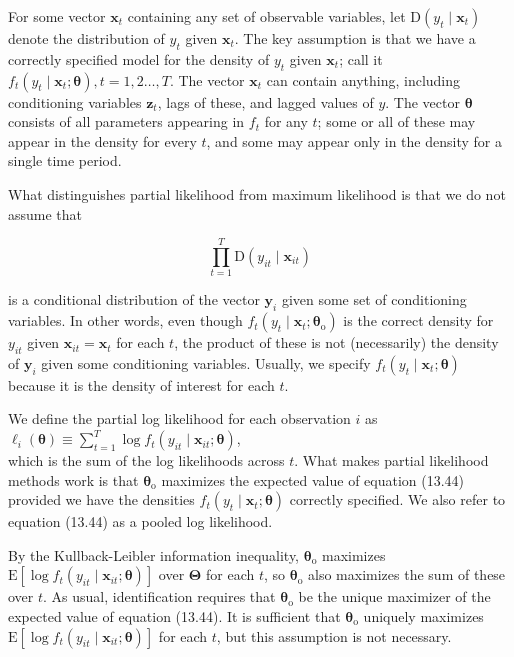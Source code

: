 \documentclass[10pt]{article}
\begin{document}
For some vector $\mathbf{x}_{t}$ containing any set of observable variables, let $\mathrm{D}\left(y_{t} \mid \mathbf{x}_{t}\right)$ denote the distribution of $y_{t}$ given $\mathbf{x}_{t}$. The key assumption is that we have a correctly specified model for the density of $y_{t}$ given $\mathbf{x}_{t}$; call it $f_{t}\left(y_{t} \mid \mathbf{x}_{t} ; \boldsymbol{\theta}\right), t=1,2 \ldots, T$. The vector $\mathbf{x}_{t}$ can contain anything, including conditioning variables $\mathbf{z}_{t}$, lags of these, and lagged values of $y$. The vector $\boldsymbol{\theta}$ consists of all parameters appearing in $f_{t}$ for any $t$; some or all of these may appear in the density for every $t$, and some may appear only in the density for a single time period.

What distinguishes partial likelihood from maximum likelihood is that we do not assume that


\begin{equation*}
\prod_{t=1}^{T} \mathrm{D}\left(y_{i t} \mid \mathbf{x}_{i t}\right) \tag{13.43}
\end{equation*}


is a conditional distribution of the vector $\mathbf{y}_{i}$ given some set of conditioning variables. In other words, even though $f_{t}\left(y_{t} \mid \mathbf{x}_{t} ; \boldsymbol{\theta}_{\mathrm{o}}\right)$ is the correct density for $y_{i t}$ given $\mathbf{x}_{i t}=\mathbf{x}_{t}$ for each $t$, the product of these is not (necessarily) the density of $\mathbf{y}_{i}$ given some conditioning variables. Usually, we specify $f_{t}\left(y_{t} \mid \mathbf{x}_{t} ; \boldsymbol{\theta}\right)$ because it is the density of interest for each $t$.

We define the partial log likelihood for each observation $i$ as\\
$\ell_{i}(\boldsymbol{\theta}) \equiv \sum_{t=1}^{T} \log f_{t}\left(y_{i t} \mid \mathbf{x}_{i t} ; \boldsymbol{\theta}\right)$,\\
which is the sum of the log likelihoods across $t$. What makes partial likelihood methods work is that $\boldsymbol{\theta}_{\mathrm{o}}$ maximizes the expected value of equation (13.44) provided we have the densities $f_{t}\left(y_{t} \mid \mathbf{x}_{t} ; \boldsymbol{\theta}\right)$ correctly specified. We also refer to equation (13.44) as a pooled log likelihood.

By the Kullback-Leibler information inequality, $\boldsymbol{\theta}_{\mathrm{o}}$ maximizes $\mathrm{E}\left[\log f_{t}\left(y_{i t} \mid \mathbf{x}_{i t} ; \boldsymbol{\theta}\right)\right]$ over $\boldsymbol{\Theta}$ for each $t$, so $\boldsymbol{\theta}_{\mathrm{o}}$ also maximizes the sum of these over $t$. As usual, identification requires that $\boldsymbol{\theta}_{\mathrm{o}}$ be the unique maximizer of the expected value of equation (13.44). It is sufficient that $\boldsymbol{\theta}_{\mathrm{o}}$ uniquely maximizes $\mathrm{E}\left[\log f_{t}\left(y_{i t} \mid \mathbf{x}_{i t} ; \boldsymbol{\theta}\right)\right]$ for each $t$, but this assumption is not necessary.
\end{document}
